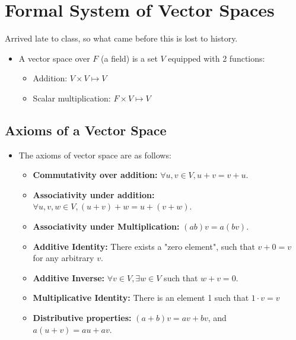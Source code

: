 \section{Formal System of Vector Spaces}
Arrived late to class, so what came before this is lost to history. 
\begin{itemize}
	\item A vector space over  \( F \) (a field) is a set \( V \) equipped with 2 functions: 
		\begin{itemize}
			\item Addition: \( V \times V \mapsto V \) 
			\item Scalar multiplication: \( F \times V \mapsto V \)
		\end{itemize}
\end{itemize}
\subsection{Axioms of a Vector Space}
\begin{itemize}
	\item The axioms of vector space are as follows:
		\begin{itemize}
			\item \textbf{Commutativity over addition:} \( \forall u, v \in V, u + v = v + u\). 
			\item \textbf{Associativity under addition:} \( \forall u, v, w \in V, (u + v) + w = u + (v + w) \).
			\item \textbf{Associativity under Multiplication:} \( (ab)v = a(bv) \). 
			\item \textbf{Additive Identity:} There exists a "zero element", such that \( v + 0 = v \) for any 
				arbitrary \( v \). 
			\item \textbf{Additive Inverse:} \( \forall v \in V, \exists w \in V \) such that \( w + v = 0 \). 
			\item \textbf{Multiplicative Identity:} There is an element 1 such that \( 1 \cdot v = v \)
			\item \textbf{Distributive properties:} \( (a + b)v = av + bv \), and \( a(u + v) = au + av \). 
		\end{itemize}
\end{itemize}
